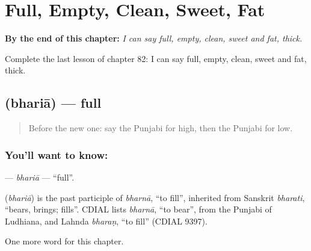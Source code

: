 
\chapter{Full, Empty, Clean, Sweet, Fat}
\label{ch:pa-full-empty-clean-sweet-fat}

\begin{chapteropening}
\textbf{By the end of this chapter:} \emph{I can say full, empty, clean, sweet and fat, thick.}

Complete the last lesson of chapter 82: I can say full, empty, clean, sweet and fat, thick.
\end{chapteropening}

\section[\texorpdfstring{\pa{ਭਰਿਆ} (bhariā)}{ਭਰਿਆ (bhariā)}]{ (bhariā) — full}

\label{lesson:PA-C82-bharia}



\begin{quote}
Before the new one: say the Punjabi for high, then the Punjabi for low.
\end{quote}

\subsection*{You'll want to know: }
\textbf{} — \emph{bhariā} — \textquotedblleft{}full\textquotedblright{}.

\begin{cousinweb}
\textbf{} (\emph{bhariā}) is the past participle of \emph{bharnā}, \textquotedblleft{}to fill\textquotedblright{}, inherited from Sanskrit \emph{bharati}, \textquotedblleft{}bears, brings; fills\textquotedblright{}. CDIAL lists \emph{bharnā}, \textquotedblleft{}to bear\textquotedblright{}, from the Punjabi of Ludhiana, and Lahnda \emph{bharaṇ}, \textquotedblleft{}to fill\textquotedblright{} (CDIAL 9397).
\end{cousinweb}

\begin{grammarlens}[title={What you've built}]
One more word for this chapter.
\end{grammarlens}

